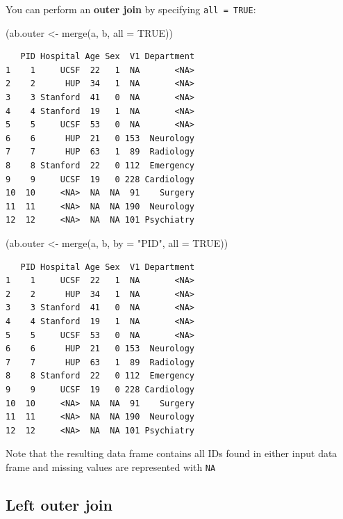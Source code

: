 \documentclass[
]{book}
\newenvironment{Shaded}{\begin{snugshade}}{\end{snugshade}}
\newcommand{\AttributeTok}[1]{\textcolor[rgb]{0.77,0.63,0.00}{#1}}
\newcommand{\ConstantTok}[1]{\textcolor[rgb]{0.00,0.00,0.00}{#1}}
\newcommand{\FunctionTok}[1]{\textcolor[rgb]{0.00,0.00,0.00}{#1}}
\newcommand{\NormalTok}[1]{#1}
\newcommand{\OtherTok}[1]{\textcolor[rgb]{0.56,0.35,0.01}{#1}}
\newcommand{\StringTok}[1]{\textcolor[rgb]{0.31,0.60,0.02}{#1}}
\begin{document}
You can perform an \textbf{outer join} by specifying \texttt{all\ =\ TRUE}:

\begin{Shaded}
\begin{Highlighting}[]
\NormalTok{(ab.outer }\OtherTok{\textless{}{-}} \FunctionTok{merge}\NormalTok{(a, b, }\AttributeTok{all =} \ConstantTok{TRUE}\NormalTok{))}
\end{Highlighting}
\end{Shaded}

\begin{verbatim}
   PID Hospital Age Sex  V1 Department
1    1     UCSF  22   1  NA       <NA>
2    2      HUP  34   1  NA       <NA>
3    3 Stanford  41   0  NA       <NA>
4    4 Stanford  19   1  NA       <NA>
5    5     UCSF  53   0  NA       <NA>
6    6      HUP  21   0 153  Neurology
7    7      HUP  63   1  89  Radiology
8    8 Stanford  22   0 112  Emergency
9    9     UCSF  19   0 228 Cardiology
10  10     <NA>  NA  NA  91    Surgery
11  11     <NA>  NA  NA 190  Neurology
12  12     <NA>  NA  NA 101 Psychiatry
\end{verbatim}

\begin{Shaded}
\begin{Highlighting}[]
\NormalTok{(ab.outer }\OtherTok{\textless{}{-}} \FunctionTok{merge}\NormalTok{(a, b, }\AttributeTok{by =} \StringTok{"PID"}\NormalTok{, }\AttributeTok{all =} \ConstantTok{TRUE}\NormalTok{))}
\end{Highlighting}
\end{Shaded}

\begin{verbatim}
   PID Hospital Age Sex  V1 Department
1    1     UCSF  22   1  NA       <NA>
2    2      HUP  34   1  NA       <NA>
3    3 Stanford  41   0  NA       <NA>
4    4 Stanford  19   1  NA       <NA>
5    5     UCSF  53   0  NA       <NA>
6    6      HUP  21   0 153  Neurology
7    7      HUP  63   1  89  Radiology
8    8 Stanford  22   0 112  Emergency
9    9     UCSF  19   0 228 Cardiology
10  10     <NA>  NA  NA  91    Surgery
11  11     <NA>  NA  NA 190  Neurology
12  12     <NA>  NA  NA 101 Psychiatry
\end{verbatim}

Note that the resulting data frame contains all IDs found in either input data frame and missing values are represented with \texttt{NA}

\hypertarget{left-outer-join}{%
\subsection{Left outer join}\label{left-outer-join}}
\end{document}
